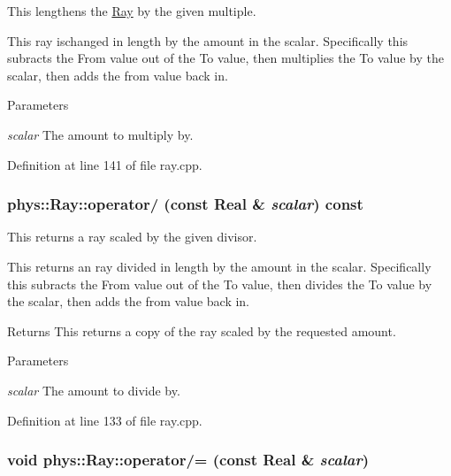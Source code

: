 This lengthens the \hyperlink{classphys_1_1Ray}{Ray} by the given multiple. 

This ray ischanged in length by the amount in the scalar. Specifically this subracts the From value out of the To value, then multiplies the To value by the scalar, then adds the from value back in. 
\begin{DoxyParams}{Parameters}
\item[{\em scalar}]The amount to multiply by. \end{DoxyParams}


Definition at line 141 of file ray.cpp.

\hypertarget{classphys_1_1Ray_a126f8e4db94cccb5c0040db29c771a47}{
\subsubsection[{operator/}]{ phys::Ray::operator/ (const {\bf Real} \& {\em scalar}) const}}
\label{df/d57/classphys_1_1Ray_a126f8e4db94cccb5c0040db29c771a47}


This returns a ray scaled by the given divisor. 

This returns an ray divided in length by the amount in the scalar. Specifically this subracts the From value out of the To value, then divides the To value by the scalar, then adds the from value back in. \begin{DoxyReturn}{Returns}
This returns a copy of the ray scaled by the requested amount. 
\end{DoxyReturn}

\begin{DoxyParams}{Parameters}
\item[{\em scalar}]The amount to divide by. \end{DoxyParams}


Definition at line 133 of file ray.cpp.

\hypertarget{classphys_1_1Ray_a11f681152a5a39c36f2b398d44657ecd}{
\subsubsection[{operator/=}]{\setlength{\rightskip}{0pt plus 5cm}void phys::Ray::operator/= (const {\bf Real} \& {\em scalar})}}
\label{df/d57/classphys_1_1Ray_a11f681152a5a39c36f2b398d44657ecd}


